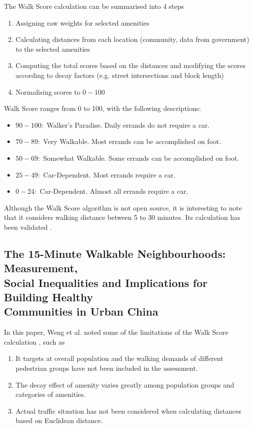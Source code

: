 The Walk Score calculation can be summarised into 4 steps

\begin{enumerate}
    \item Assigning raw weights for selected amenities
    \item Calculating distances from each location (community, data from government) to the selected amenities
    \item Computing the total scores based on the distances and modifying the scores according to decay factors (e.g. street intersections and block length)
    \item Normalising scores to $0-100$
\end{enumerate}

Walk Score ranges from 0 to 100, with the following descriptions:

\begin{itemize}
    \item $90-100:$ Walker's Paradise. Daily errands do not require a car.
    \item $70-89:$ Very Walkable. Most errands can be accomplished on foot.
    \item $50-69:$ Somewhat Walkable. Some errands can be accomplished on foot.
    \item $25-49:$ Car-Dependent. Most errands require a car.
    \item $0-24:$ Car-Dependent. Almost all errands require a car.
\end{itemize}

Although the Walk Score algorithm is not open source, it is interesting to note that it considers walking distance between 5 to 30 minutes. Its calculation has been validated \cite{carr_validation_2011}.

\subsection{The 15-Minute Walkable Neighbourhoods: Measurement, \\ Social Inequalities and Implications for Building Healthy \\ Communities in Urban China}

In this paper, Weng et al. noted some of the limitations of the Walk Score calculation \cite{weng_15-minute_2019}, such as

\begin{enumerate}
    \item It targets at overall population and the walking demands of different pedestrian groups have not been included in the assessment.
    \item The decay effect of amenity varies greatly among population groups and categories of amenities.
    \item Actual traffic situation has not been considered when calculating distances based on Euclidean distance.
\end{enumerate}

